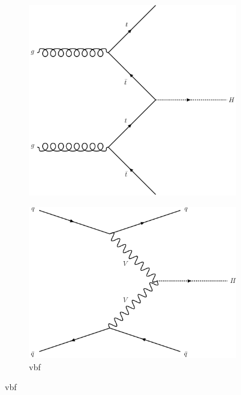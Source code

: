\begin{figure}[htbp]
    \centering
    \begin{subfigure}[b]{0.45\textwidth}
        \includegraphics[width=\textwidth]{figures/feynman_diagrams/ttH.png}
        \caption{\ttH}
    \end{subfigure}
    \hfill
    \begin{subfigure}[b]{0.45\textwidth}
        \includegraphics[width=\textwidth]{figures/feynman_diagrams/VBF.png}
        \caption{\acrshort{vbf}}
    \end{subfigure}

\end{figure}
